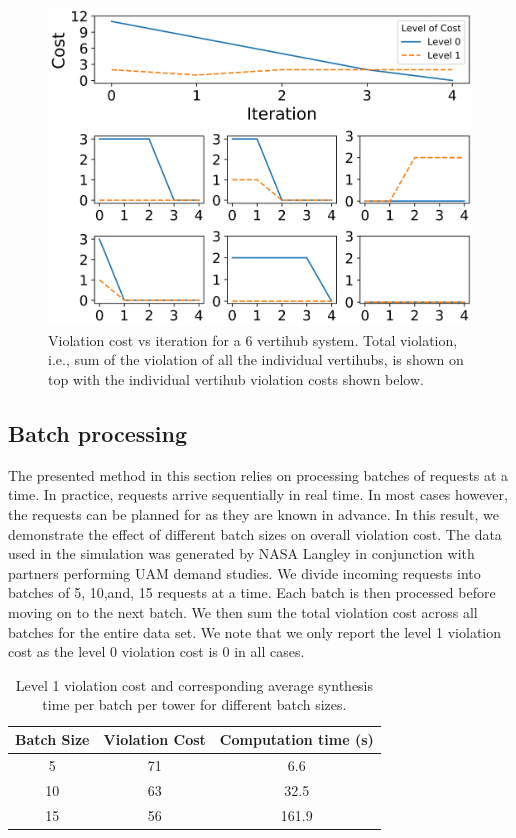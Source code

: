 \begin{figure}[h!]
    \centering
    \includegraphics[width=0.85\columnwidth]{UAM-NFM/Figures/cost_vs_iteration_compiled.png}
    \caption{Violation cost vs iteration for a 6 vertihub system. Total violation, i.e., sum of the violation of all the individual vertihubs, is shown on top with the individual vertihub violation costs shown below.}
    \label{fig:costreduction}
\end{figure}



\subsection{Batch processing} The presented method in this section relies on processing batches of requests at a time. In practice, requests arrive sequentially in real time. In most cases however, the requests can be planned for as they are known in advance. In this result, we demonstrate the effect of different batch sizes on overall violation cost. The data used in the simulation was generated by NASA Langley in conjunction with partners performing UAM demand studies. We divide incoming requests into batches of 5, 10,and, 15 requests at a time. Each batch is then processed before moving on to the next batch. We then sum the total violation cost across all batches for the entire data set. We note that we only report the level 1 violation cost as the level 0 violation cost is 0 in all cases. 

\begin{table}[]
\centering
\begin{tabular}{|c|c|c|} \toprule
Batch Size  & Violation Cost & Computation time (s) \\ \midrule
      5     &     71           &      6.6            \\
      10     &     63           &     32.5            \\
      15     &     56           &     161.9         \\ \bottomrule   
\end{tabular}
\caption{Level 1 violation cost and corresponding average synthesis time per batch per tower for different batch sizes.  } \label{tab:batchsizes}
\end{table}


